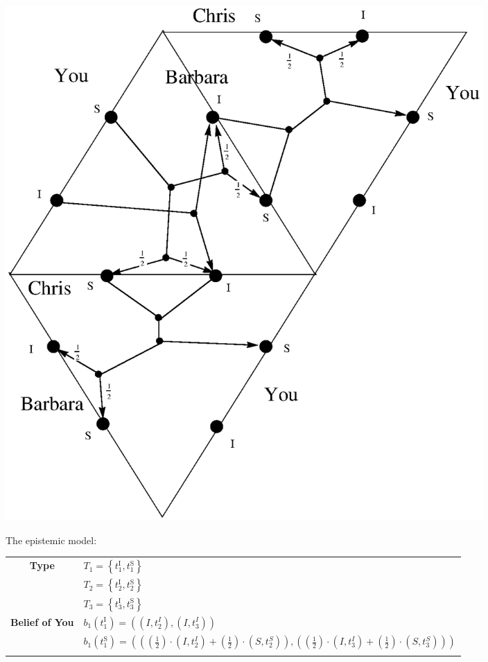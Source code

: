 \documentclass{article}
\begin{document}
\begin{description}
\begin{center}
                    \includegraphics[angle=0, width=0.8\textwidth]{ECON3160A3P5}\\
    \end{center}
       The epistemic model:
    \begin{center}
        \begin{tabular}{cl}
        \hline
        \hline
        \multicolumn{ 1}{c}{{\bf Type}} &          $T_1=\left\{t_1^{\text{I}},t_1^{\text{S}}\right\}$ \\

        \multicolumn{ 1}{c}{{\bf }} &          $T_2=\left\{t_2^{\text{I}},t_2^{\text{S}}\right\}$ \\

        \multicolumn{ 1}{c}{{\bf }} &          $T_3=\left\{t_3^{\text{I}},t_3^{\text{S}}\right\}$ \\
        \hline
        \multicolumn{ 1}{c}{{\bf Belief of You}} &         $b_1\left(t_1^{\text{I}}\right)=\left(\left(I,t_2^I\right),\left(I,t_3^I\right)\right)$\\

        \multicolumn{ 1}{c}{{\bf }} &         $b_1\left(t_1^{\text{S}}\right)=\left(\left(\left(\frac{1}{2}\right)\cdot \left(I,t_2^I\right)+\left(\frac{1}{2}\right)\cdot \left(S,t_2^S\right)\right),\left(\left(\frac{1}{2}\right)\cdot \left(I,t_3^I\right)+\left(\frac{1}{2}\right)\cdot \left(S,t_3^S\right)\right)\right)$ \\\\


\end{tabular}
\end{center}
\end{description}
\end{document}
